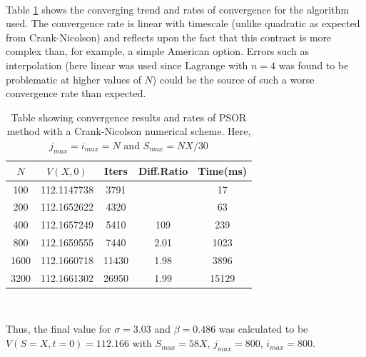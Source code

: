 \documentclass{article}
\begin{document}
\\
\par Table \ref{table:euro_convergence} shows the converging trend and rates of convergence for the algorithm used.
The convergence rate is linear with timescale (unlike quadratic as expected from Crank-Nicolson)
and reflects upon the fact that this contract is more complex than, for example, a simple American option.
Errors such as interpolation (here linear was used since Lagrange with $n=4$ was found to be problematic at higher values of $N$) could be the source of such a worse convergence rate than expected.
\begin{table}[!h]
\centering
\begin{tabular}{c|c c c c|}
$N$ & $V(X,0)$ & Iters & Diff.Ratio & Time(ms)\\
\hline
100 & 112.1147738  & 3791 &   &  17 \\
200 & 112.1652622  & 4320 &   &  63 \\
400 & 112.1657249  & 5410 & 109 &  239 \\
800 & 112.1659555  & 7440 & 2.01 &  1023 \\
1600 & 112.1660718  & 11430 & 1.98 &  3896 \\
3200 & 112.1661302  & 26950 & 1.99 &  15129 \\
\hline
\end{tabular}
\caption{Table showing convergence results and rates of PSOR method with
a Crank-Nicolson numerical scheme. Here, $j_{max}=i_{max}=N$ and $S_{max}=N X/30$}
\label{table:euro_convergence}
\end{table}
\\
\par Thus, the final value for $\sigma=3.03$ and $\beta=0.486$ was calculated to be $V(S=X,t=0)=112.166$ with $S_{max}=58X$, $j_{max}=800$, $i_{max}=800$.
\end{document}
